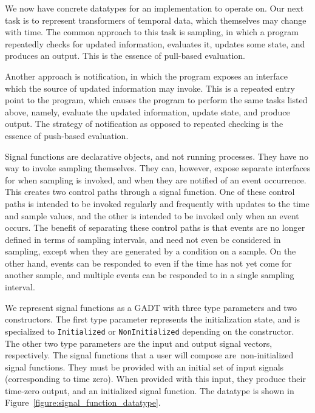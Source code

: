 We now have concrete datatypes for an implementation to operate on. Our next
task is to represent transformers of temporal data, which themselves may change
with time. The common approach to this task is sampling, in which a program
repeatedly checks for updated information, evaluates it, updates some state,
and produces an output. This is the essence of pull-based evaluation.

Another approach is notification, in which the program exposes an interface
which the source of updated information may invoke. This is a repeated entry
point to the program, which causes the program to perform the same tasks
listed above, namely, evaluate the updated information, update state, and
produce output. The strategy of notification as opposed to repeated checking is
the essence of push-based evaluation.

Signal functions are declarative objects, and not running processes. They have
no way to invoke sampling themselves. They can, however, expose separate
interfaces for when sampling is invoked, and when they are notified of an event
occurrence. This creates two control paths through a signal function. One of
these control paths is intended to be invoked regularly and frequently with
updates to the time and sample values, and the other is intended to be invoked
only when an event occurs. The benefit of separating these control paths is that
events are no longer defined in terms of sampling intervals, and need not even
be considered in sampling, except when they are generated by a condition on a
sample. On the other hand, events can be responded to even if the time has not
yet come for another sample, and multiple events can be responded to in a single
sampling interval.

We represent signal functions as a GADT with three type parameters and two 
constructors. The first type parameter represents the initialization state,
and is specialized to {\tt Initialized} or {\tt NonInitialized} depending on the
constructor. The other two type parameters are the input and output signal
vectors, respectively. The signal functions that a user will compose are\
non-initialized signal functions. They must be provided with an initial set of
input signals (corresponding to time zero). When provided with this input, they
produce their time-zero output, and an initialized signal function. The datatype
is shown in Figure~\ref{figure:signal_function_datatype}.

